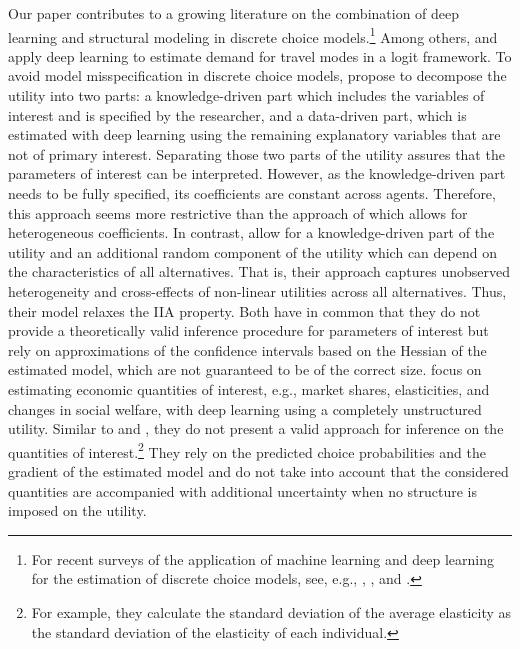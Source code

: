 \documentclass[a4paper, 12pt]{article}
\begin{document}
Our paper contributes to a growing literature on the combination of deep learning and structural modeling in discrete choice models.\footnote{For recent surveys of the application of machine learning and deep learning for the estimation of discrete choice models, see, e.g., , , and .} Among others,  and   apply deep learning to estimate demand for travel modes in a logit framework. 
To avoid model misspecification in discrete choice models,  propose to decompose the utility into two parts: a knowledge-driven part which includes the variables of interest and  is specified by the researcher, and a data-driven part, which is estimated with deep learning using the remaining explanatory variables that are not of primary interest. Separating those two parts of the utility assures that the parameters of interest can be interpreted. However, as the knowledge-driven part needs to be fully specified, its coefficients are constant across  agents. Therefore,  this approach seems more restrictive than the approach of    which allows for heterogeneous coefficients. 
In contrast,   allow for a knowledge-driven part of the utility and an additional random component of the utility which can depend on the characteristics of all alternatives. That is,  their approach captures unobserved heterogeneity and  cross-effects of non-linear utilities across all alternatives. Thus, their model relaxes the IIA property. 
Both have in common that they do not provide a theoretically valid inference procedure for parameters of  interest but rely on  approximations of the confidence intervals based on the Hessian of the estimated model, which are not guaranteed to be of the correct size.
 focus on estimating economic quantities of interest, e.g., market shares, elasticities, and changes in social welfare, with deep learning using a completely unstructured utility. Similar to  and , they do not present a valid approach for inference on the quantities of interest.\footnote{For example, they calculate the standard deviation of the average elasticity as the standard deviation of the elasticity of each individual.} They rely on the predicted choice probabilities and the gradient of the estimated model and do not take into account that the considered quantities are accompanied with additional uncertainty when no structure is imposed on the utility.
\end{document}
